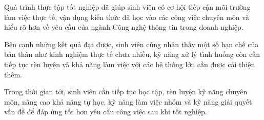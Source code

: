 
Quá trình thực tập tốt nghiệp đã giúp sinh viên có cơ hội tiếp cận môi trường làm việc thực tế, vận dụng kiến thức đã học vào các công việc chuyên môn và hiểu rõ hơn về yêu cầu của ngành Công nghệ thông tin trong doanh nghiệp.

Bên cạnh những kết quả đạt được, sinh viên cũng nhận thấy một số hạn chế của bản thân như kinh nghiệm thực tế chưa nhiều, kỹ năng xử lý tình huống còn cần tiếp tục rèn luyện và khả năng làm việc với các hệ thống lớn cần được cải thiện thêm.

Trong thời gian tới, sinh viên cần tiếp tục học tập, rèn luyện kỹ năng chuyên môn, nâng cao khả năng tự học, kỹ năng làm việc nhóm và kỹ năng giải quyết vấn đề để đáp ứng tốt hơn yêu cầu công việc sau khi tốt nghiệp.
